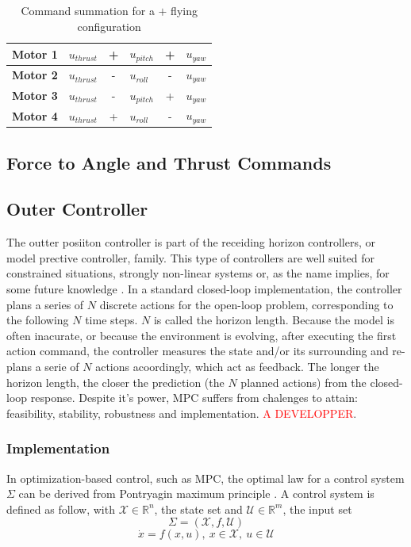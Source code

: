 \documentclass[a4paper, 12pt]{report}
\begin{document}
\begin{table}[htdp]
\caption{Command summation for a $+$  flying configuration}
\centering
\begin{tabular}{|l|l c l c l|}
\hline
\textbf{Motor 1} & $u_{thrust}$ & + &$u_{pitch}$ & + & $u_{yaw}$\\
\hline
\hline
\textbf{Motor 2} & $u_{thrust}$ & - & $u_{roll}$ & - & $u_{yaw}$ \\
\hline
\hline
\textbf{Motor 3} & $u_{thrust}$ & - & $u_{pitch}$ & + & $u_{yaw}$\\
\hline
\hline
\textbf{Motor 4} & $u_{thrust}$ & + & $u_{roll}$ & - & $u_{yaw}$ \\
\hline
\end{tabular}
\label{tab:motorDistribution}
\end{table}

\subsection{Force to Angle and Thrust Commands}
\subsection{Outer Controller}

The outter posiiton controller is part of the receiding horizon controllers, or model prective controller, family. This type of controllers are well suited for constrained situations, strongly non-linear systems or, as the name implies, for some future knowledge \cite{Borelli2015}. In a standard closed-loop implementation, the controller plans a series of $N$ discrete actions for the open-loop problem, corresponding to the following $N$ time steps. $N$ is called the horizon length. Because the model is often inacurate, or because the environment is evolving, after executing the first action command, the controller measures the state and/or its surrounding and re-plans a serie of $N$ actions acoordingly, which act as feedback. The longer the horizon length, the closer the prediction (the $N$ planned actions) from the closed-loop response. Despite it's power, MPC suffers from chalenges to attain: feasibility, stability, robustness and implementation. \textcolor{red}{A DEVELOPPER}.

\subsubsection{Implementation}
In optimization-based control, such as MPC, the optimal law for a control system $\Sigma$ can be derived from Pontryagin maximum principle \cite{Lewis2006, Murray2010}. A control system is defined as follow, with $\mathcal{X} \in \mathbb{R}^n$, the state set and $\mathcal{U} \in \mathbb{R}^m$, the input set
\[ \Sigma = (\mathcal{X}, f, \mathcal{U}) \]
\[ \dot x = f(x,u),\ x \in \mathcal{X},\ u \in \mathcal{U} \]
\end{document}
